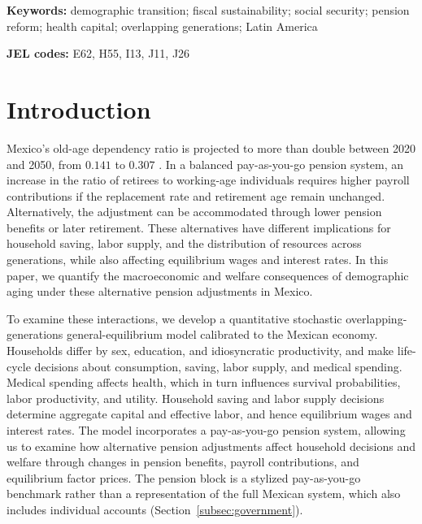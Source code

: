 \documentclass[12pt,a4paper]{article}
\begin{document}
\noindent\textbf{Keywords:} demographic transition; fiscal sustainability; social security; pension reform; health capital; overlapping generations; Latin America

\noindent\textbf{JEL codes:} E62, H55, I13, J11, J26



\section{Introduction}
\label{sec:intro}

Mexico's old-age dependency ratio is projected to more than double between 2020 and 2050, from $0.141$ to $0.307$ \citep{CONAPO2023}. In a balanced pay-as-you-go pension system, an increase in the ratio of retirees to working-age individuals requires higher payroll contributions if the replacement rate and retirement age remain unchanged. Alternatively, the adjustment can be accommodated through lower pension benefits or later retirement. These alternatives have different implications for household saving, labor supply, and the distribution of resources across generations, while also affecting equilibrium wages and interest rates. In this paper, we quantify the macroeconomic and welfare consequences of demographic aging under these alternative pension adjustments in Mexico.

To examine these interactions, we develop a quantitative stochastic overlapping-generations general-equilibrium model calibrated to the Mexican economy. Households differ by sex, education, and idiosyncratic productivity, and make life-cycle decisions about consumption, saving, labor supply, and medical spending. Medical spending affects health, which in turn influences survival probabilities, labor productivity, and utility. Household saving and labor supply decisions determine aggregate capital and effective labor, and hence equilibrium wages and interest rates. The model incorporates a pay-as-you-go pension system, allowing us to examine how alternative pension adjustments affect household decisions and welfare through changes in pension benefits, payroll contributions, and equilibrium factor prices. The pension block is a stylized pay-as-you-go benchmark rather than a representation of the full Mexican system, which also includes individual accounts (Section~\ref{subsec:government}).
\end{document}
